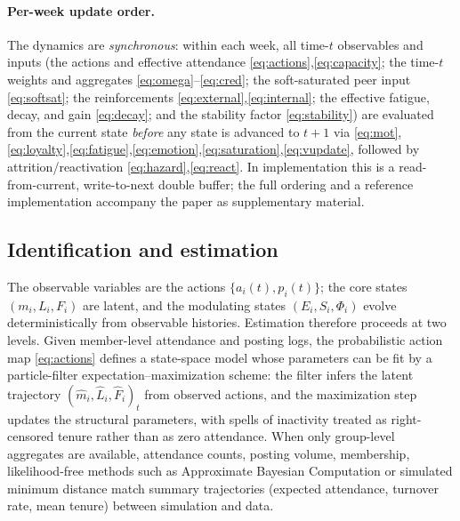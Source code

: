 \documentclass[11pt]{article}
\begin{document}
\paragraph{Per-week update order.}
The dynamics are \emph{synchronous}: within each week, all time-$t$ observables and inputs (the actions and effective attendance \eqref{eq:actions},\eqref{eq:capacity}; the time-$t$ weights and aggregates \eqref{eq:omega}--\eqref{eq:cred}; the soft-saturated peer input \eqref{eq:softsat}; the reinforcements \eqref{eq:external},\eqref{eq:internal}; the effective fatigue, decay, and gain \eqref{eq:decay}; and the stability factor \eqref{eq:stability}) are evaluated from the current state \emph{before} any state is advanced to $t{+}1$ via \eqref{eq:mot},\eqref{eq:loyalty},\eqref{eq:fatigue},\eqref{eq:emotion},\eqref{eq:saturation},\eqref{eq:vupdate}, followed by attrition/reactivation \eqref{eq:hazard},\eqref{eq:react}. In implementation this is a read-from-current, write-to-next double buffer; the full ordering and a reference implementation accompany the paper as supplementary material.

\subsection{Identification and estimation}\label{sec:estimation}
The observable variables are the actions $\{a_i(t),p_i(t)\}$; the core states $(m_i,L_i,F_i)$ are latent, and the modulating states $(E_i,S_i,\Phi_i)$ evolve deterministically from observable histories. Estimation therefore proceeds at two levels. Given member-level attendance and posting logs, the probabilistic action map \eqref{eq:actions} defines a state-space model whose parameters can be fit by a particle-filter expectation--maximization scheme: the filter infers the latent trajectory $(\hat m_i,\hat L_i,\hat F_i)_t$ from observed actions, and the maximization step updates the structural parameters, with spells of inactivity treated as right-censored tenure rather than as zero attendance. When only group-level aggregates are available, attendance counts, posting volume, membership, likelihood-free methods such as Approximate Bayesian Computation or simulated minimum distance match summary trajectories (expected attendance, turnover rate, mean tenure) between simulation and data.
\end{document}
